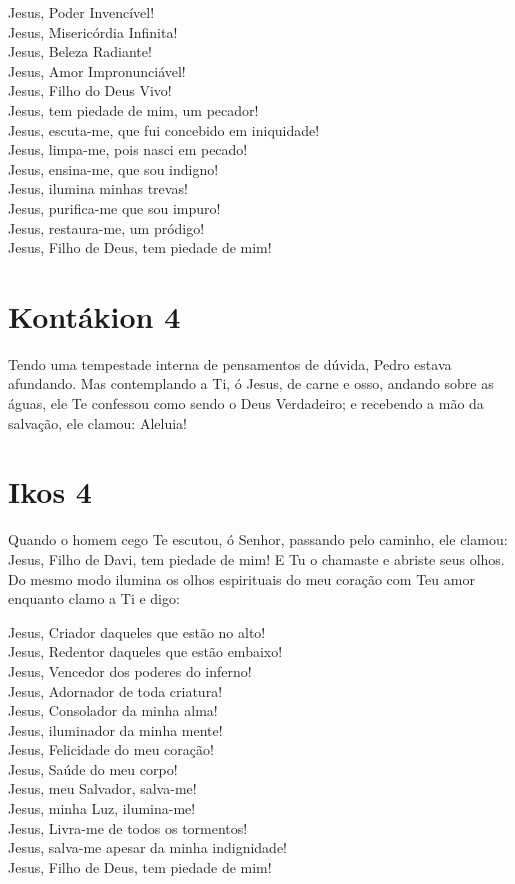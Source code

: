 \documentclass{subfiles}
\begin{document}
Jesus, Poder Invencível! \\
Jesus, Misericórdia Infinita! \\
Jesus, Beleza Radiante! \\
Jesus, Amor Impronunciável! \\
Jesus, Filho do Deus Vivo! \\
Jesus, tem piedade de mim, um pecador! \\
Jesus, escuta-me, que fui concebido em iniquidade! \\
Jesus, limpa-me, pois nasci em pecado! \\
Jesus, ensina-me, que sou indigno! \\
Jesus, ilumina minhas trevas! \\
Jesus, purifica-me que sou impuro! \\
Jesus, restaura-me, um pródigo! \\
Jesus, Filho de Deus, tem piedade de mim!

\section*{Kontákion 4}

Tendo uma tempestade interna de pensamentos de dúvida, Pedro
estava afundando. Mas contemplando a Ti, ó Jesus, de carne e osso, andando
sobre as águas, ele Te confessou como sendo o Deus Verdadeiro; e recebendo
a mão da salvação, ele clamou: Aleluia!

\section*{Ikos 4}

Quando o homem cego Te escutou, ó Senhor, passando pelo caminho,
ele clamou: Jesus, Filho de Davi, tem piedade de mim! E Tu o chamaste e
abriste seus olhos. Do mesmo modo ilumina os olhos espirituais do meu
coração com Teu amor enquanto clamo a Ti e digo:

Jesus, Criador daqueles que estão no alto! \\
Jesus, Redentor daqueles que estão embaixo! \\
Jesus, Vencedor dos poderes do inferno! \\
Jesus, Adornador de toda criatura! \\
Jesus, Consolador da minha alma! \\
Jesus, iluminador da minha mente! \\
Jesus, Felicidade do meu coração! \\
Jesus, Saúde do meu corpo! \\
Jesus, meu Salvador, salva-me! \\
Jesus, minha Luz, ilumina-me! \\
Jesus, Livra-me de todos os tormentos! \\
Jesus, salva-me apesar da minha indignidade! \\
Jesus, Filho de Deus, tem piedade de mim!
\end{document}
